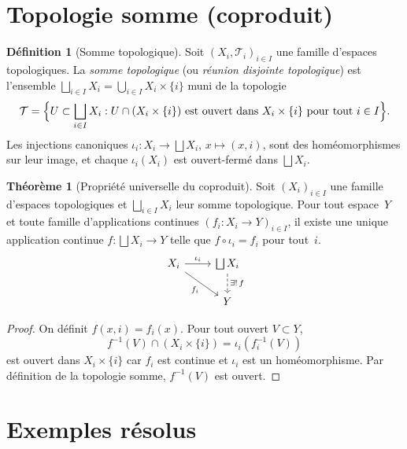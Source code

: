 \documentclass[12pt,a4paper,openany]{book}
\theoremstyle{definition}
\newtheorem{definition}{Définition}[chapter]
\theoremstyle{cours}
\newtheorem{theoreme}{Théorème}[chapter]
\theoremstyle{coursnormal}
\begin{document}
\section{Topologie somme (coproduit)}
\label{sec:topologie-somme}

\begin{definition}[Somme topologique]
\label{def:topologie-somme}
Soit $(X_i, \mathcal{T}_i)_{i \in I}$ une famille d'espaces topologiques.
La \emph{somme topologique} (ou \emph{réunion disjointe topologique}) est
l'ensemble $\bigsqcup_{i \in I} X_i = \bigcup_{i \in I} X_i \times \{i\}$ muni
de la topologie
\[
\mathcal{T} = \Bigl\{ U \subset \bigsqcup_{i \in I} X_i :
U \cap (X_i \times \{i\}) \text{ est ouvert dans } X_i \times \{i\}
\text{ pour tout } i \in I \Bigr\}.
\]
Les injections canoniques $\iota_i \colon X_i \to \bigsqcup X_i$, $x \mapsto (x,i)$,
sont des homéomorphismes sur leur image, et chaque $\iota_i(X_i)$ est ouvert-fermé
dans $\bigsqcup X_i$.
\end{definition}

\begin{theoreme}[Propriété universelle du coproduit]
\label{thm:universelle-coproduit}
Soit $(X_i)_{i \in I}$ une famille d'espaces topologiques et
$\bigsqcup_{i \in I} X_i$ leur somme topologique. Pour tout espace~$Y$ et toute
famille d'applications continues $(f_i \colon X_i \to Y)_{i \in I}$, il existe une
unique application continue $f \colon \bigsqcup X_i \to Y$ telle que
$f \circ \iota_i = f_i$ pour tout~$i$.
\[
\begin{tikzcd}
  X_i \arrow[r, "\iota_i"] \arrow[dr, "f_i"'] & \bigsqcup X_i \arrow[d, dashed, "\exists!\, f"] \\
  & Y
\end{tikzcd}
\]
\end{theoreme}

\begin{proof}
On définit $f(x, i) = f_i(x)$. Pour tout ouvert $V \subset Y$,
\[
f^{-1}(V) \cap (X_i \times \{i\}) = \iota_i(f_i^{-1}(V))
\]
est ouvert dans $X_i \times \{i\}$ car $f_i$ est continue et $\iota_i$ est un
homéomorphisme. Par définition de la topologie somme, $f^{-1}(V)$ est ouvert.
\end{proof}

\section{Exemples résolus}
\label{sec:exemples-produit-quotient}
\end{document}
